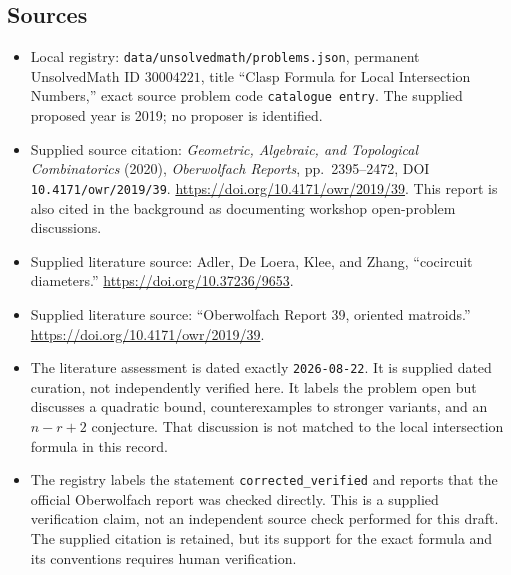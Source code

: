 \documentclass[11pt]{article}
\begin{document}
\subsection{Sources}
\begin{itemize}
\item Local registry: \texttt{data/unsolvedmath/problems.json}, permanent UnsolvedMath ID \(30004221\), title ``Clasp Formula for Local Intersection Numbers,'' exact source problem code \texttt{catalogue entry}. The supplied proposed year is 2019; no proposer is identified.
\item Supplied source citation: \emph{Geometric, Algebraic, and Topological Combinatorics} (2020), \emph{Oberwolfach Reports}, pp.\ 2395--2472, DOI \texttt{10.4171/owr/2019/39}. \url{https://doi.org/10.4171/owr/2019/39}. This report is also cited in the background as documenting workshop open-problem discussions.
\item Supplied literature source: Adler, De Loera, Klee, and Zhang, ``cocircuit diameters.'' \url{https://doi.org/10.37236/9653}.
\item Supplied literature source: ``Oberwolfach Report 39, oriented matroids.'' \url{https://doi.org/10.4171/owr/2019/39}.
\item The literature assessment is dated exactly \texttt{2026-08-22}. It is supplied dated curation, not independently verified here. It labels the problem open but discusses a quadratic bound, counterexamples to stronger variants, and an \(n-r+2\) conjecture. That discussion is not matched to the local intersection formula in this record.
\item The registry labels the statement \texttt{corrected\_verified} and reports that the official Oberwolfach report was checked directly. This is a supplied verification claim, not an independent source check performed for this draft. The supplied citation is retained, but its support for the exact formula and its conventions requires human verification.
\end{itemize}
\end{document}

